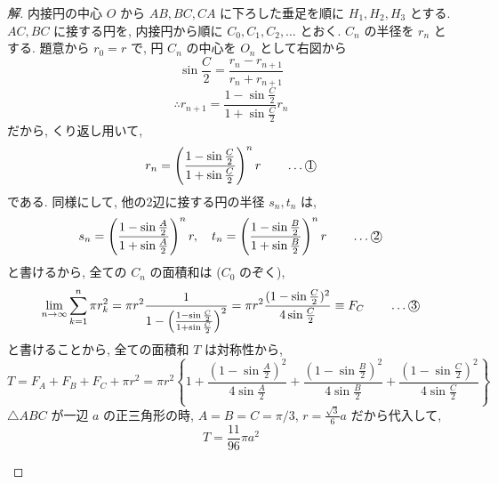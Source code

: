 \documentclass[../main.tex]{subfiles}
\begin{document}
\begin{proof}[解]
  内接円の中心 $O$ から $AB, BC, CA$ に下ろした垂足を順に $H_1, H_2, H_3$ とする. $AC, BC$ に接する円を, 内接円から順に $C_0, C_1, C_2, \dots$ とおく. $C_n$ の半径を $r_n$ とする. 題意から $r_0 = r$ で, 円 $C_n$ の中心を $O_n$ として右図から
  \[
    \sin \frac{C}{2} = \frac{r_n - r_{n+1}}{r_n + r_{n+1}}
  \]
  \[
    \therefore r_{n+1} = \frac{1 - \sin\frac{C}{2}}{1 + \sin\frac{C}{2}} r_n
  \]
  だから, くり返し用いて,
  \[
    r_n = \left(\frac{1 - \sin\frac{C}{2}}{1 + \sin\frac{C}{2}}\right)^n r \qquad \dots \text{\textcircled{1}}
  \]
  である. 同様にして, 他の2辺に接する円の半径 $s_n, t_n$ は,
  \[
    s_n = \left(\frac{1 - \sin\frac{A}{2}}{1 + \sin\frac{A}{2}}\right)^n r, \quad t_n = \left(\frac{1 - \sin\frac{B}{2}}{1 + \sin\frac{B}{2}}\right)^n r \qquad \dots \text{\textcircled{2}}
  \]
  と書けるから, 全ての $C_n$ の面積和は ($C_0$ のぞく),
  \[
    \lim_{n \to \infty} \sum_{k=1}^n \pi r_k^2 = \pi r^2 \frac{1}{1 - \left(\frac{1-\sin\frac{C}{2}}{1+\sin\frac{C}{2}}\right)^2} = \pi r^2 \frac{(1 - \sin\frac{C}{2})^2}{4 \sin\frac{C}{2}} \equiv F_C \qquad \dots \text{\textcircled{3}}
  \]
  と書けることから, 全ての面積和 $T$ は対称性から,
  \[
    T = F_A + F_B + F_C + \pi r^2 = \pi r^2 \left\{ 1 + \frac{(1-\sin\frac{A}{2})^2}{4\sin\frac{A}{2}} + \frac{(1-\sin\frac{B}{2})^2}{4\sin\frac{B}{2}} + \frac{(1-\sin\frac{C}{2})^2}{4\sin\frac{C}{2}} \right\}
  \]
  $\triangle ABC$ が一辺 $a$ の正三角形の時, $A=B=C=\pi/3$, $r = \frac{\sqrt{3}}{6} a$ だから代入して,
  \[
    T = \frac{11}{96} \pi a^2
  \]

  \begin{center}
  \end{center}
\end{proof}
\end{document}
